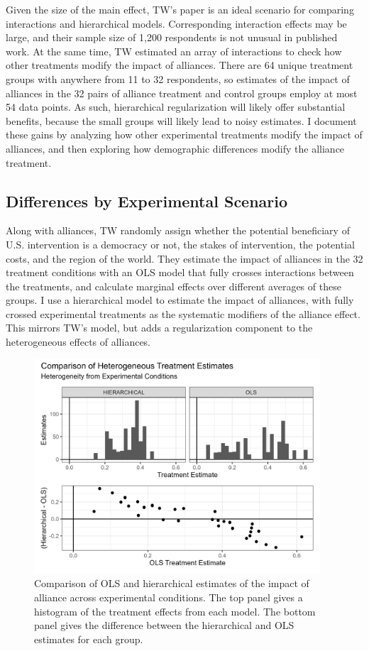 \documentclass[12pt]{article}
\begin{document}
Given the size of the main effect, TW's paper is an ideal scenario for comparing interactions and hierarchical models. 
Corresponding interaction effects may be large, and their sample size of 1,200 respondents is not unusual in published work. 
At the same time, TW estimated an array of interactions to check how other treatments modify the impact of alliances.
There are 64 unique treatment groups with anywhere from 11 to 32 respondents, so estimates of the impact of alliances in the 32 pairs of alliance treatment and control groups employ at most 54 data points. 
As such, hierarchical regularization will likely offer substantial benefits, because the small groups will likely lead to noisy estimates.
I document these gains by analyzing how other experimental treatments modify the impact of alliances, and then exploring how demographic differences modify the alliance treatment. 



\subsection{Differences by Experimental Scenario}


Along with alliances, TW randomly assign whether the potential beneficiary of U.S. intervention is a democracy or not, the stakes of intervention, the potential costs, and the region of the world. 
They estimate the impact of alliances in the 32 treatment conditions with an OLS model that fully crosses interactions between the treatments, and calculate marginal effects over different averages of these groups. 
I use a hierarchical model to estimate the impact of alliances, with fully crossed experimental treatments as the systematic modifiers of the alliance effect.
This mirrors TW's model, but adds a regularization component to the heterogeneous effects of alliances.


\begin{figure}[htpb]
	\centering
		\includegraphics[width=0.95\textwidth]{../figures/tw-het-treat-comp.png}
	\caption{Comparison of OLS and hierarchical estimates of the impact of alliance across experimental conditions. The top panel gives a histogram of the treatment effects from each model. The bottom panel gives the difference between the hierarchical and OLS estimates for each group.}
	\label{fig:tw-het-treat-comp}
\end{figure}
\end{document}
